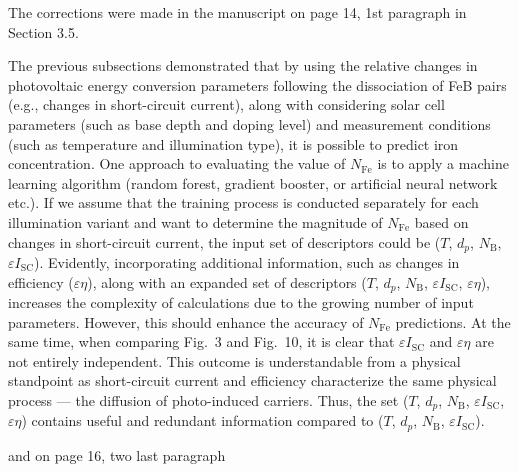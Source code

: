 \documentclass[a4paper,fleqn]{cas-sc}
\begin{document}
The corrections were made in the manuscript on page 14, 1st paragraph in Section 3.5.


\begin{mdframed}
The previous subsections demonstrated that by using the relative changes in photovoltaic energy conversion parameters following the dissociation of FeB pairs
(e.g., changes in short-circuit current),
along with considering solar cell parameters (such as base depth and doping level)
and measurement conditions (such as temperature and illumination type), it is possible to predict iron concentration.
One approach to evaluating the value of $N_\mathrm{Fe}$ is to apply a machine learning algorithm (random forest, gradient booster, or artificial neural network etc.).
If we assume that the training process is conducted separately for each illumination variant \textcolor[rgb]{1.00,0.07,0.00}{ and want to
determine the magnitude of $N_\mathrm{Fe}$ based on changes in short-circuit current},
the input set of descriptors could be
($T$, $d_p$, $N_\mathrm{B}$, $\varepsilon I_\mathrm{SC}$).
\textcolor[rgb]{1.00,0.07,0.00}{Evidently, incorporating additional information, such as changes in efficiency ($\varepsilon \eta$), along with an expanded
set of descriptors ($T$, $d_p$, $N_\mathrm{B}$, $\varepsilon I_\mathrm{SC}$, $\varepsilon \eta$),
increases the complexity of calculations due to the growing number of input parameters.
However, this should enhance the accuracy of $N_\mathrm{Fe}$ predictions.
At the same time, }when comparing Fig.~3 and Fig.~10, it is clear that  $\varepsilon I_\mathrm{SC}$ and $\varepsilon \eta$ are not entirely independent.
\textcolor[rgb]{1.00,0.07,0.00}{This outcome is understandable from a physical standpoint as
short-circuit current and efficiency characterize the same physical process --- the diffusion of photo-induced carriers.
Thus, the set ($T$, $d_p$, $N_\mathrm{B}$, $\varepsilon I_\mathrm{SC}$, $\varepsilon \eta$)
contains useful and redundant information compared to ($T$, $d_p$, $N_\mathrm{B}$, $\varepsilon I_\mathrm{SC}$).}
\end{mdframed}


and on page 16, two last paragraph
\end{document}
